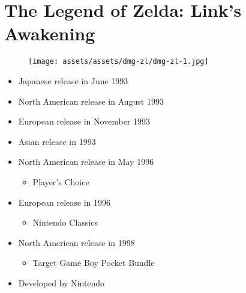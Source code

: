 \documentclass{book}
\begin{document}
\begingroup \chapter*{The Legend of Zelda: Link’s Awakening} \endgroup
\begin{figure}[H]
\vskip 4pt
\centering
\texttt{[image: assets/assets/dmg-zl/dmg-zl-1.jpg]}\end{figure}
\begin{itemize} [nosep]




\item Japanese release in June 1993







\item North American release in August 1993







\item European release in November 1993







\item Asian release in 1993







\item North American release in May 1996
\begin{itemize} [nosep]\item Player’s Choice\end{itemize}\noindent






\item European release in 1996
\begin{itemize} [nosep]\item Nintendo Classics\end{itemize}\noindent






\item North American release in 1998
\begin{itemize} [nosep]\item Target Game Boy Pocket Bundle\end{itemize}\noindent











\item Developed by Nintendo

\end{itemize}\noindent
\end{document}
